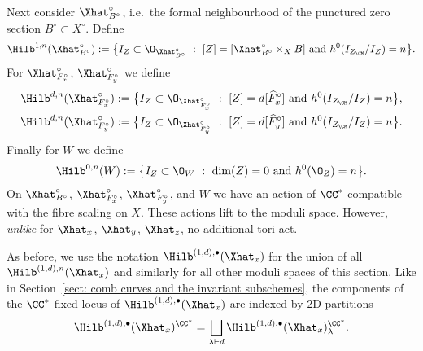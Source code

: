 Next consider $\Xhat ^{\circ}_{B^\circ}$, i.e.~the formal neighbourhood of the punctured zero section $B^\circ \subset X^\circ$. Define
$$
\Hilb^{1,n}(\Xhat ^{\circ}_{B^\circ}) := \big\{ I_Z \subset \O_{\Xhat ^{\circ}_{B^\circ}} \ : \ [Z] = [\Xhat ^{\circ}_{B^\circ} \times_X B] \ {\rm{and}} \ h^0(I_{Z_{\CM}} / I_Z) = n \big\}.
$$
For $\Xhat ^{\circ}_{F_{x}^{\circ}}$, $\Xhat ^{\circ}_{F_{y}^{\circ}}$ we define
\begin{align*}
\Hilb^{d,n}(\Xhat ^{\circ}_{F_{x}^{\circ}}) &:= \big\{ I_Z \subset \O_{\Xhat ^{\circ}_{F_{x}^{\circ}}} \ : \ [Z] = d [\widehat{F}_{x}^{\circ}] \ {\rm{and}} \ h^0(I_{Z_{\CM}} / I_Z) = n \big\}, \\
\Hilb^{d,n}(\Xhat ^{\circ}_{F_{y}^{\circ}}) &:= \big\{ I_Z \subset \O_{\Xhat ^{\circ}_{F_{y}^{\circ}}} \ : \ [Z] = d [\widehat{F}_{y}^{\circ}] \ {\rm{and}} \ h^0(I_{Z_{\CM}} / I_Z) = n \big\}.
\end{align*}
Finally for $W$ we define
$$
\Hilb^{0,n}(W) := \big\{ I_Z \subset \O_{W} \ : \ \dim(Z) = 0 \ {\rm{and}} \ h^0(\O_Z) = n \big\}.
$$
On $\Xhat ^{\circ}_{B^\circ}$, $\Xhat ^{\circ}_{F_{x}^{\circ}}$, $\Xhat ^{\circ}_{F_{y}^{\circ}}$, and $W$ we have an action of $\CC^*$ compatible with the fibre scaling on $X$. These actions lift to the moduli space. However, \emph{unlike} for $\Xhat _x$, $\Xhat _y$, $\Xhat _z$, no additional tori act.

As before, we use the notation $\Hilb^{(1,d),\bullet}(\Xhat _x)$ for
the union of all $\Hilb^{(1,d),n}(\Xhat _x)$ and similarly for all
other moduli spaces of this section. Like in Section~\ref{sect: comb
curves and the invariant subschemes}, the components of the
$\CC^*$-fixed locus of $\Hilb^{(1,d),\bullet}(\Xhat _x)$ are indexed
by 2D partitions
$$
\Hilb^{(1,d),\bullet}(\Xhat _x)^{\CC^*} = \bigsqcup_{\lambda \vdash d} \Hilb^{(1,d),\bullet}(\Xhat _x)_{\lambda}^{\CC^*}.
$$

